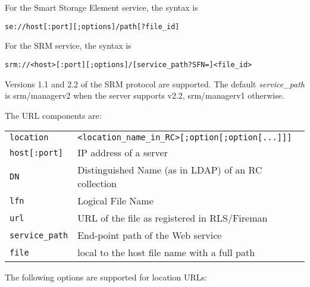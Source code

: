 For the Smart Storage Element service, the syntax is
\begin{shaded}
   \verb#se://host[:port][;options]/path[?file_id]#
\end{shaded}

For the SRM service, the syntax is
\begin{shaded}
   \verb#srm://<host>[:port][;options]/[service_path?SFN=]<file_id>#
\end{shaded}

Versions 1.1 and 2.2 of the SRM protocol are supported. The
default \emph{service\_path} is srm/managerv2 when the server supports
v2.2, srm/managerv1 otherwise.

The URL components are:

\begin{tabular}{lp{10cm}}
   \verb#location#&\verb#<location_name_in_RC>[;option[;option[...]]]#\\
   \verb#host[:port]#&IP address of a server\\
   \verb#DN#&Distinguished Name (as in LDAP) of an RC collection\\
   \verb#lfn#&Logical File Name\\
   \verb#url#&URL of the file as registered in RLS/Fireman\\
   \verb#service_path#&End-point path of the Web service\\
   \verb#file#&local to the host file name with a full path\\
\end{tabular}

The following options are supported for location URLs:


